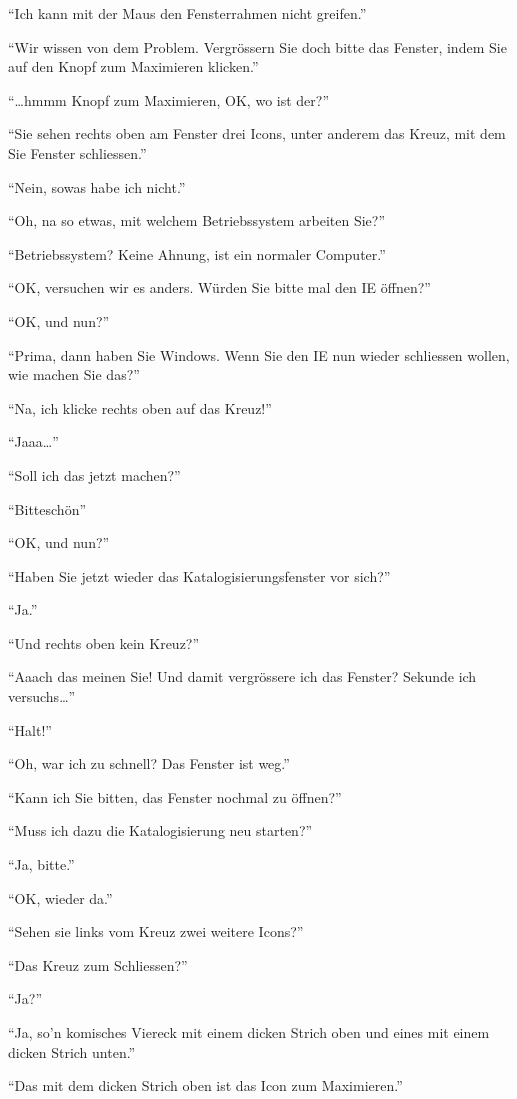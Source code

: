 \documentclass[german,headsepline]{scrartcl}
\begin{document}
``Ich kann mit der Maus den Fensterrahmen nicht greifen.''

``Wir wissen von dem Problem. Vergrössern Sie doch bitte das Fenster, indem Sie auf den Knopf zum Maximieren klicken.''

``\ldots hmmm Knopf zum Maximieren, OK, wo ist der?''

``Sie sehen rechts oben am Fenster drei Icons, unter anderem das Kreuz, mit dem Sie Fenster schliessen.''

``Nein, sowas habe ich nicht.''

``Oh, na so etwas, mit welchem Betriebssystem arbeiten Sie?''

``Betriebssystem? Keine Ahnung, ist ein normaler Computer.''

``OK, versuchen wir es anders. Würden Sie bitte mal den IE öffnen?''

``OK, und nun?''

``Prima, dann haben Sie Windows. Wenn Sie den IE nun wieder schliessen wollen, wie machen Sie das?''

``Na, ich klicke rechts oben auf das Kreuz!''

``Jaaa\ldots''

``Soll ich das jetzt machen?''

``Bitteschön''

``OK, und nun?''

``Haben Sie jetzt wieder das Katalogisierungsfenster vor sich?''

``Ja.''

``Und rechts oben kein Kreuz?''

``Aaach das meinen Sie! Und damit vergrössere ich das Fenster? Sekunde ich versuchs\ldots''

``Halt!''

``Oh, war ich zu schnell? Das Fenster ist weg.''

``Kann ich Sie bitten, das Fenster nochmal zu öffnen?''

``Muss ich dazu die Katalogisierung neu starten?''

``Ja, bitte.''

``OK, wieder da.''

``Sehen sie links vom Kreuz zwei weitere Icons?''

``Das Kreuz zum Schliessen?''

``Ja?''

``Ja, so'n komisches Viereck mit einem dicken Strich oben und eines mit einem dicken Strich unten.''

``Das mit dem dicken Strich oben ist das Icon zum Maximieren.''
\end{document}
